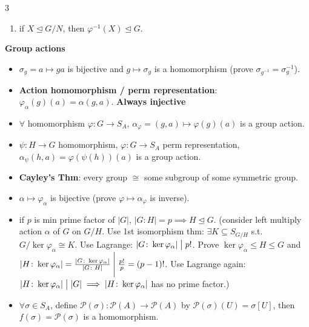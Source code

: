 \documentclass[10pt]{article}
\newcommand{\abs}[1]{\left\lvert#1\right\rvert} %
\begin{document}
\begin{multicols*}{3}
\begin{itemize}
\begin{enumerate}
                \item if $X \trianglelefteq G \slash N$, then $\varphi^{-1}\left(X\right) \trianglelefteq G$.
            \end{enumerate}
        \end{itemize}
        \textbf{Group actions}
        \begin{itemize}
            \item $\sigma_g = a \mapsto ga$ is bijective and $g \mapsto \sigma_g$ is a homomorphism (prove $\sigma_{g^{-1}} = \sigma_g^{-1}$).
            \item \textbf{Action homomorphism / perm representation}: $\varphi_{\alpha}\left(g\right)\left(a\right) = \alpha\left(g, a\right)$. \textbf{Always injective}
            \item $\forall$ homomorphism $\varphi \colon G \to S_A$, $\alpha_{\varphi} = \left(g, a\right) \mapsto \varphi\left(g\right)\left(a\right)$ is a group action.
            \item $\psi \colon H \to G$ homomorphism, $\varphi \colon G \to S_A$ perm representation, $\alpha_{\psi}\left(h, a\right) = \varphi\left(\psi\left(h\right)\right)\left(a\right)$ is a group action.
            \item \textbf{Cayley's Thm}: every group $\cong$ some subgroup of some symmetric group.
            \item $\alpha \mapsto \varphi_{\alpha}$ is bijective (prove $\varphi \mapsto \alpha_{\varphi}$ is inverse).
            \item if $p$ is min prime factor of $\abs{G}$, $\abs{G \colon H} = p \implies H \trianglelefteq G$. (consider left multiply action $\alpha$ of $G$ on $G \slash H$. Use 1st isomorphism thm: $\exists K \subseteq S_{G \slash H}$ s.t. $G \slash \ker{\varphi_{\alpha}} \cong K$. Use Lagrange: $\abs{G \colon \ker{\varphi_{\alpha}}} \bigm\vert p!$. Prove $\ker{\varphi_{\alpha}} \leq H \leq G$ and $\abs{H \colon \ker{\varphi_{\alpha}}} = \frac{\abs{G \colon \ker{\varphi_{\alpha}}}}{\abs{G \colon H}} \Biggm\vert \frac{p!}{p} = \left(p - 1\right)!$. Use Lagrange again: $\abs{H \colon \ker{\varphi_{\alpha}}} \bigm\vert \abs{G} \implies \abs{H \colon \ker{\varphi_{\alpha}}}$ has no prime factor.)
            \item $\forall \sigma \in S_A$, define $\mathcal{P}\left(\sigma\right) \colon \mathcal{P}\left(A\right) \to \mathcal{P}\left(A\right)$ by $\mathcal{P}\left(\sigma\right)\left(U\right) = \sigma\left[U\right]$, then $f\left(\sigma\right) = \mathcal{P}\left(\sigma\right)$ is a homomorphism.

\end{itemize}
\end{multicols*}
\end{document}
